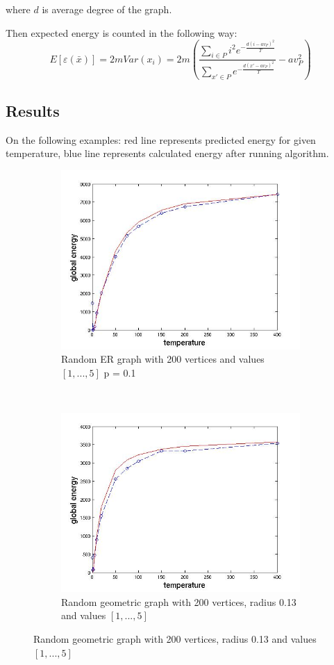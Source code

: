 \documentclass[12pt]{report}
\begin{document}
where $d$ is average degree of the graph. 

Then expected energy is counted in the following way:
$$ E[\varepsilon (\bar{x})] = 2mVar(x_i)  = 2m\left(\frac{ \sum\limits_{i\in P} i^2 e^{- \frac{d(i - av_P)^2}{T}} }{ \sum\limits_{x'\in P} e^{-\frac{d(x' - av_P)^2}{T}}} - av_P^2\right)$$


\subsection{Results}




On the following examples: red line represents predicted energy for given temperature, blue line represents calculated energy after running algorithm. 

\begin{figure}[t]
    \centering
    \begin{subfigure}[b]{0.4\textwidth}
        \includegraphics[width=\textwidth]{er200x01}
        \caption{ Random ER graph with 200 vertices and values $[1, ..., 5]$ p = 0.1}

    \end{subfigure}
	~
    \begin{subfigure}[b]{0.4\textwidth}
        \includegraphics[width=\textwidth]{rgg200x013}
        \caption{ Random geometric graph with 200 vertices, radius 0.13 and values $[1, ..., 5]$ }


\end{subfigure}
\end{figure}
\end{document}
